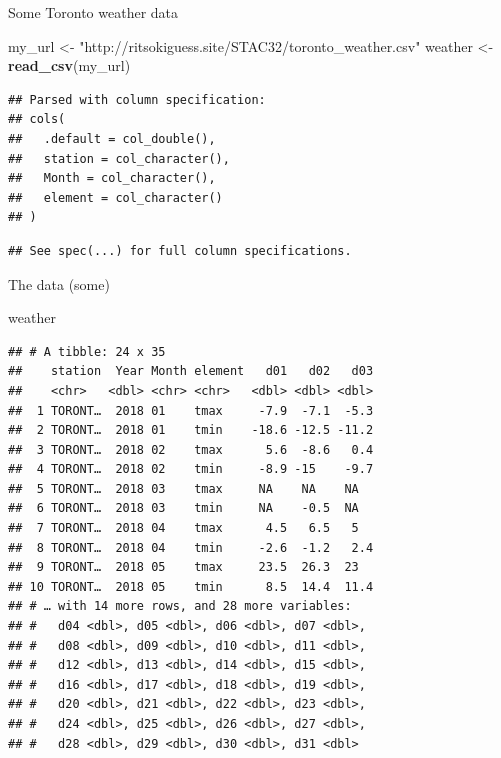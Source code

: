 \documentclass[
  ignorenonframetext,
]{beamer}
\newenvironment{Shaded}{\begin{snugshade}}{\end{snugshade}}
\newcommand{\KeywordTok}[1]{\textcolor[rgb]{0.13,0.29,0.53}{\textbf{#1}}}
\newcommand{\NormalTok}[1]{#1}
\newcommand{\StringTok}[1]{\textcolor[rgb]{0.31,0.60,0.02}{#1}}
\begin{document}
\begin{frame}[fragile]{Some Toronto weather data}
\protect\hypertarget{some-toronto-weather-data}{}

\begin{Shaded}
\begin{Highlighting}[]
\NormalTok{my_url <-}\StringTok{ }
\StringTok{  "http://ritsokiguess.site/STAC32/toronto_weather.csv"}
\NormalTok{weather <-}\StringTok{ }\KeywordTok{read_csv}\NormalTok{(my_url)}
\end{Highlighting}
\end{Shaded}

\begin{verbatim}
## Parsed with column specification:
## cols(
##   .default = col_double(),
##   station = col_character(),
##   Month = col_character(),
##   element = col_character()
## )
\end{verbatim}

\begin{verbatim}
## See spec(...) for full column specifications.
\end{verbatim}

\end{frame}

\begin{frame}[fragile]{The data (some)}
\protect\hypertarget{the-data-some-2}{}

\begin{Shaded}
\begin{Highlighting}[]
\NormalTok{weather}
\end{Highlighting}
\end{Shaded}

\begin{verbatim}
## # A tibble: 24 x 35
##    station  Year Month element   d01   d02   d03
##    <chr>   <dbl> <chr> <chr>   <dbl> <dbl> <dbl>
##  1 TORONT…  2018 01    tmax     -7.9  -7.1  -5.3
##  2 TORONT…  2018 01    tmin    -18.6 -12.5 -11.2
##  3 TORONT…  2018 02    tmax      5.6  -8.6   0.4
##  4 TORONT…  2018 02    tmin     -8.9 -15    -9.7
##  5 TORONT…  2018 03    tmax     NA    NA    NA  
##  6 TORONT…  2018 03    tmin     NA    -0.5  NA  
##  7 TORONT…  2018 04    tmax      4.5   6.5   5  
##  8 TORONT…  2018 04    tmin     -2.6  -1.2   2.4
##  9 TORONT…  2018 05    tmax     23.5  26.3  23  
## 10 TORONT…  2018 05    tmin      8.5  14.4  11.4
## # … with 14 more rows, and 28 more variables:
## #   d04 <dbl>, d05 <dbl>, d06 <dbl>, d07 <dbl>,
## #   d08 <dbl>, d09 <dbl>, d10 <dbl>, d11 <dbl>,
## #   d12 <dbl>, d13 <dbl>, d14 <dbl>, d15 <dbl>,
## #   d16 <dbl>, d17 <dbl>, d18 <dbl>, d19 <dbl>,
## #   d20 <dbl>, d21 <dbl>, d22 <dbl>, d23 <dbl>,
## #   d24 <dbl>, d25 <dbl>, d26 <dbl>, d27 <dbl>,
## #   d28 <dbl>, d29 <dbl>, d30 <dbl>, d31 <dbl>
\end{verbatim}

\end{frame}
\end{document}

